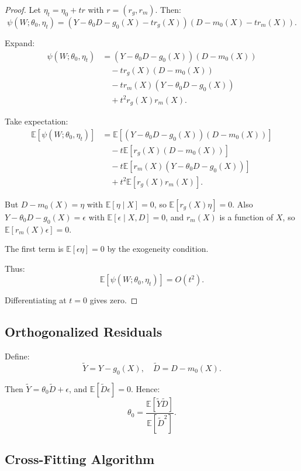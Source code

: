 \documentclass[12pt]{article}
\numberwithin{equation}{section}
\begin{document}
	\begin{proof}
		Let $\eta_t = \eta_0 + t r$ with $r = (r_g, r_m)$. Then:
		\[
		\psi(W; \theta_0, \eta_t) = (Y - \theta_0 D - g_0(X) - t r_g(X)) (D - m_0(X) - t r_m(X)).
		\]
		
		Expand:
		\begin{align*}
			\psi(W; \theta_0, \eta_t) &= (Y - \theta_0 D - g_0(X))(D - m_0(X)) \\
			&\quad - t r_g(X)(D - m_0(X)) \\
			&\quad - t r_m(X)(Y - \theta_0 D - g_0(X)) \\
			&\quad + t^2 r_g(X) r_m(X).
		\end{align*}
		
		Take expectation:
		\begin{align*}
			\mathbb{E}[\psi(W; \theta_0, \eta_t)] &= \mathbb{E}[(Y - \theta_0 D - g_0(X))(D - m_0(X))] \\
			&\quad - t \mathbb{E}[r_g(X)(D - m_0(X))] \\
			&\quad - t \mathbb{E}[r_m(X)(Y - \theta_0 D - g_0(X))] \\
			&\quad + t^2 \mathbb{E}[r_g(X) r_m(X)].
		\end{align*}
		
		But $D - m_0(X) = \eta$ with $\mathbb{E}[\eta \mid X] = 0$, so $\mathbb{E}[r_g(X) \eta] = 0$. Also $Y - \theta_0 D - g_0(X) = \epsilon$ with $\mathbb{E}[\epsilon \mid X, D] = 0$, and $r_m(X)$ is a function of $X$, so $\mathbb{E}[r_m(X) \epsilon] = 0$.
		
		The first term is $\mathbb{E}[\epsilon \eta] = 0$ by the exogeneity condition.
		
		Thus:
		\[
		\mathbb{E}[\psi(W; \theta_0, \eta_t)] = O(t^2).
		\]
		
		Differentiating at $t=0$ gives zero. \end{proof}
	
	\subsection{Orthogonalized Residuals}
	
	Define:
	\[
	\tilde{Y} = Y - g_0(X), \quad \tilde{D} = D - m_0(X).
	\]
	
	Then $\tilde{Y} = \theta_0 \tilde{D} + \epsilon$, and $\mathbb{E}[\tilde{D} \epsilon] = 0$. Hence:
	\[
	\theta_0 = \frac{\mathbb{E}[\tilde{Y} \tilde{D}]}{\mathbb{E}[\tilde{D}^2]}.
	\]
	
	\subsection{Cross-Fitting Algorithm}
	
\end{document}
